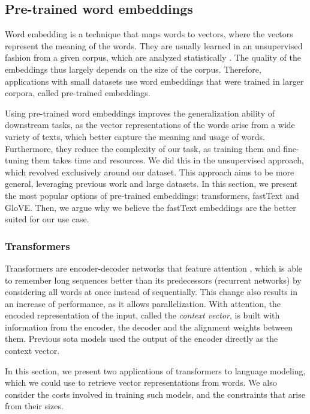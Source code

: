 \subsection{Pre-trained word embeddings} \label{supervised_approach_embeddings}

Word embedding is a technique that maps words to vectors, where the vectors represent the meaning of the words. They are usually learned in an unsupervised fashion from a given corpus, which are analyzed statistically \cite{mikolov2017advances}. The quality of the embeddings thus largely depends on the size of the corpus. Therefore, applications with small datasets use word embeddings that were trained in larger corpora, called pre-trained embeddings.

Using pre-trained word embeddings improves the generalization ability of downstream tasks, as the vector representations of the words arise from a wide variety of texts, which better capture the meaning and usage of words. Furthermore, they reduce the complexity of our task, as training them and fine-tuning them takes time and resources. We did this in the unsupervised approach, which revolved exclusively around our dataset. This approach aims to be more general, leveraging previous work and large datasets. In this section, we present the most popular options of pre-trained embeddings: transformers, fastText and GloVE. Then, we argue why we believe the fastText embeddings are the better suited for our use case.

\subsubsection{Transformers}

Transformers are encoder-decoder networks that feature attention \cite{vaswani2017attention}, which is able to remember long sequences better than its predecessors (recurrent networks) by considering all words at once instead of sequentially. This change also results in an increase of performance, as it allows parallelization. With attention, the encoded representation of the input, called the \textit{context vector}, is built with information from the encoder, the decoder and the alignment weights between them. Previous \acrshort{sota} models used the output of the encoder directly as the context vector.

In this section, we present two applications of transformers to language modeling, which we could use to retrieve vector representations from words. We also consider the costs involved in training such models, and the constraints that arise from their sizes.

